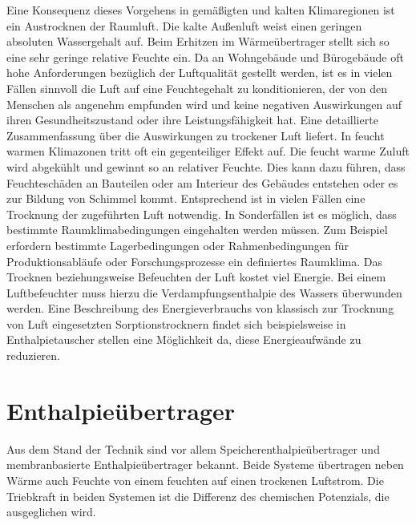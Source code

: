 \begin{normalsize}
\begin{LARGE}
Eine Konsequenz dieses Vorgehens in gemäßigten und kalten Klimaregionen ist ein Austrocknen der Raumluft. Die kalte Außenluft weist einen geringen absoluten Wassergehalt auf. Beim Erhitzen im Wärmeübertrager stellt sich so eine sehr geringe relative Feuchte ein. 
Da an Wohngebäude und Bürogebäude oft hohe Anforderungen bezüglich der Luftqualität gestellt werden, ist es in vielen Fällen sinnvoll die Luft auf eine Feuchtegehalt zu konditionieren, der von den Menschen als angenehm empfunden wird und keine negativen Auswirkungen auf ihren Gesundheitszustand oder ihre Leistungsfähigkeit hat. Eine detaillierte Zusammenfassung über die Auswirkungen zu trockener Luft liefert.\cite{JurgenSchniedersDr.RainerPflugerDr.WolfgangFeist.Oktober}
In feucht warmen Klimazonen tritt oft ein gegenteiliger Effekt auf. Die feucht warme Zuluft wird abgekühlt und gewinnt so an relativer Feuchte. Dies kann dazu führen, dass Feuchteschäden an Bauteilen oder am Interieur des Gebäudes entstehen oder es zur Bildung von Schimmel kommt. Entsprechend ist in vielen Fällen eine Trocknung der zugeführten Luft notwendig. \cite{Zhang.2010}
In Sonderfällen ist es möglich, dass bestimmte Raumklimabedingungen eingehalten werden müssen. Zum Beispiel erfordern bestimmte Lagerbedingungen oder Rahmenbedingungen für Produktionsabläufe oder Forschungsprozesse ein definiertes Raumklima. 
Das Trocknen beziehungsweise Befeuchten der Luft kostet viel Energie. Bei einem Luftbefeuchter muss hierzu die Verdampfungsenthalpie des Wassers überwunden werden. Eine Beschreibung des Energieverbrauchs von klassisch zur Trocknung von Luft eingesetzten Sorptionstrocknern findet sich beispielsweise in \cite{Zhang.2006}
Enthalpietauscher stellen eine Möglichkeit da, diese Energieaufwände zu reduzieren. 

\section{Enthalpieübertrager}
\label{Enthalpieübertrager}

Aus dem Stand der Technik sind vor allem Speicherenthalpieübertrager und membranbasierte Enthalpieübertrager bekannt. Beide Systeme übertragen neben Wärme auch Feuchte von einem feuchten auf einen trockenen Luftstrom. Die Triebkraft in beiden Systemen ist die Differenz des chemischen Potenzials, die ausgeglichen wird. 


\end{LARGE}
\end{normalsize}
